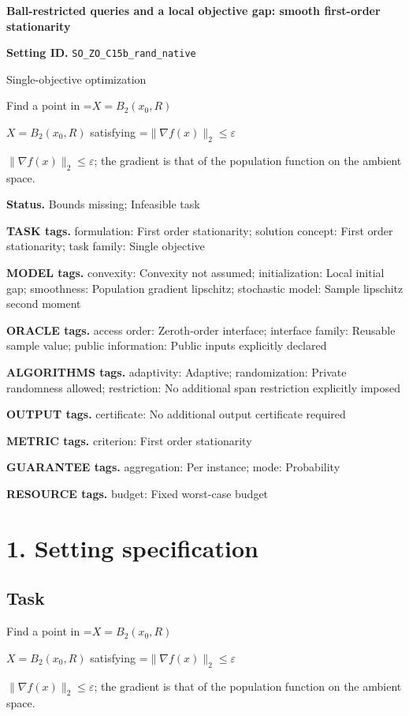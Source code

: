 \documentclass[10pt,a4paper]{article}
\newcommand{\AtlasMath}[1]{\par\begingroup\centering\setbox0=\hbox{$\displaystyle #1$}\ifdim\wd0>1.4\linewidth\typeout{ATLAS WIDE FORMULA: \the\wd0}\fi\ifdim\wd0>\linewidth\resizebox{\linewidth}{!}{\box0}\else\box0\fi\par\endgroup}
\newcommand{\AtlasInlineMath}[1]{\begingroup\setbox0=\hbox{$#1$}\ifdim\wd0>.4\linewidth\endgroup\AtlasMath{#1}\else\endgroup$#1$\fi}
\begin{document}
\raggedright

{\LARGE\bfseries\sffamily\color{AtlasNavy} Ball-restricted queries and a local objective gap: smooth first-order stationarity\par}\vspace{5pt}
\textbf{Setting ID.} \texttt{SO\_\allowbreak{}ZO\_\allowbreak{}C15b\_\allowbreak{}rand\_\allowbreak{}native}

Single-objective optimization

Find a point in \AtlasInlineMath{X=B_2(x_0,R)} satisfying \AtlasInlineMath{\|\nabla f(x)\|_2\le\varepsilon}; the gradient is that of the population function on the ambient space.

\textbf{Status.} Bounds missing; Infeasible task

\textbf{TASK tags.} formulation: First order stationarity; solution concept: First order stationarity; task family: Single objective

\textbf{MODEL tags.} convexity: Convexity not assumed; initialization: Local initial gap; smoothness: Population gradient lipschitz; stochastic model: Sample lipschitz second moment

\textbf{ORACLE tags.} access order: Zeroth-order interface; interface family: Reusable sample value; public information: Public inputs explicitly declared

\textbf{ALGORITHMS tags.} adaptivity: Adaptive; randomization: Private randomness allowed; restriction: No additional span restriction explicitly imposed

\textbf{OUTPUT tags.} certificate: No additional output certificate required

\textbf{METRIC tags.} criterion: First order stationarity

\textbf{GUARANTEE tags.} aggregation: Per instance; mode: Probability

\textbf{RESOURCE tags.} budget: Fixed worst-case budget

\section{1. Setting specification}
\subsection{Task}
Find a point in \AtlasInlineMath{X=B_2(x_0,R)} satisfying \AtlasInlineMath{\|\nabla f(x)\|_2\le\varepsilon}; the gradient is that of the population function on the ambient space.
\end{document}
